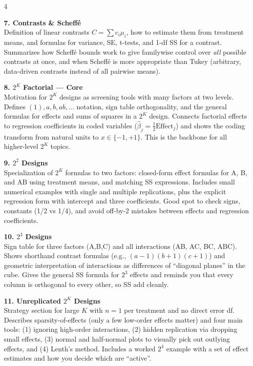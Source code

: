\documentclass[7pt,letterpaper,landscape]{extarticle}
\begin{document}
\begin{multicols*}{4}
{\textbf{7. Contrasts \& Scheffé}\\
Definition of linear contrasts $C=\sum c_i\mu_i$, how to estimate them from treatment means, and formulas for variance, SE, t-tests, and 1-df SS for a contrast. Summarizes how Scheffé bounds work to give familywise control over \emph{all} possible contrasts at once, and when Scheffé is more appropriate than Tukey (arbitrary, data-driven contrasts instead of all pairwise means).

\textbf{8. $2^K$ Factorial — Core}\\
Motivation for $2^K$ designs as screening tools with many factors at two levels. Defines $(1),a,b,ab,\dots$ notation, sign table orthogonality, and the general formulas for effects and sums of squares in a $2^K$ design. Connects factorial effects to regression coefficients in coded variables ($\hat\beta_j = \tfrac12\text{Effect}_j$) and shows the coding transform from natural units to $x\in\{-1,+1\}$. This is the backbone for all higher-level $2^K$ topics.

\textbf{9. $2^2$ Designs}\\
Specialization of $2^K$ formulas to two factors: closed-form effect formulas for A, B, and AB using treatment means, and matching SS expressions. Includes small numerical examples with single and multiple replications, plus the explicit regression form with intercept and three coefficients. Good spot to check signs, constants (1/2 vs 1/4), and avoid off-by-2 mistakes between effects and regression coefficients.

\textbf{10. $2^3$ Designs}\\
Sign table for three factors (A,B,C) and all interactions (AB, AC, BC, ABC). Shows shorthand contrast formulas (e.g., $(a-1)(b+1)(c+1)$) and geometric interpretation of interactions as differences of “diagonal planes” in the cube. Gives the general SS formula for $2^3$ effects and reminds you that every column is orthogonal to every other, so SS add cleanly.

\textbf{11. Unreplicated $2^K$ Designs}\\
Strategy section for large $K$ with $n=1$ per treatment and no direct error df. Describes sparsity-of-effects (only a few low-order effects matter) and four main tools: (1) ignoring high-order interactions, (2) hidden replication via dropping small effects, (3) normal and half-normal plots to visually pick out outlying effects, and (4) Lenth’s method. Includes a worked $2^4$ example with a set of effect estimates and how you decide which are “active”.

}
\end{multicols*}
\end{document}
